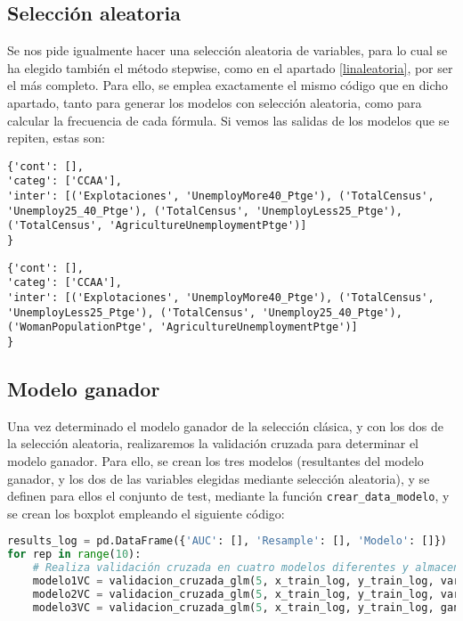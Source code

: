 \documentclass[a4paper,onecolumn]{extarticle}
\begin{document}
\begin{sloppypar}
\subsection{Selección aleatoria}\label{logaleatoria}
Se nos pide igualmente hacer una selección aleatoria de variables, para lo cual se ha elegido también el método stepwise, como en el apartado \ref{linaleatoria},
por ser el más completo. Para ello, se emplea exactamente el mismo código que en dicho apartado, tanto para generar los modelos con selección aleatoria, como 
para calcular la frecuencia de cada fórmula. Si vemos las salidas de los modelos que se repiten, estas son:
\begin{lstlisting}[numbers=none]
{'cont': [],
'categ': ['CCAA'],
'inter': [('Explotaciones', 'UnemployMore40_Ptge'), ('TotalCensus', 'Unemploy25_40_Ptge'), ('TotalCensus', 'UnemployLess25_Ptge'), ('TotalCensus', 'AgricultureUnemploymentPtge')]
}
\end{lstlisting}
\begin{lstlisting}[numbers=none]
{'cont': [],
'categ': ['CCAA'],
'inter': [('Explotaciones', 'UnemployMore40_Ptge'), ('TotalCensus', 'UnemployLess25_Ptge'), ('TotalCensus', 'Unemploy25_40_Ptge'), ('WomanPopulationPtge', 'AgricultureUnemploymentPtge')]
}
\end{lstlisting}

\subsection{Modelo ganador}\label{logganador}
Una vez determinado el modelo ganador de la selección clásica, y con los dos de la selección aleatoria, realizaremos la validación cruzada para determinar el
modelo ganador. Para ello, se crean los tres modelos (resultantes del modelo ganador, y los dos de las variables elegidas mediante selección aleatoria),
y se definen para ellos el conjunto de test, mediante la función \texttt{crear\_data\_modelo}, y se crean los boxplot empleando el siguiente código:
\begin{lstlisting}[language=Python]
results_log = pd.DataFrame({'AUC': [], 'Resample': [], 'Modelo': []})
for rep in range(10):
    # Realiza validación cruzada en cuatro modelos diferentes y almacena sus R-squared en listas separadas
    modelo1VC = validacion_cruzada_glm(5, x_train_log, y_train_log, var_1_log['cont'], var_1_log['categ'], var_1_log['inter'])
    modelo2VC = validacion_cruzada_glm(5, x_train_log, y_train_log, var_2_log['cont'], var_2_log['categ'], var_2_log['inter'])
    modelo3VC = validacion_cruzada_glm(5, x_train_log, y_train_log, ganador_log['Variables']['cont'], ganador_log['Variables']['categ'], ganador_log['Variables']['inter'])
    

\end{lstlisting}
\end{sloppypar}
\end{document}
